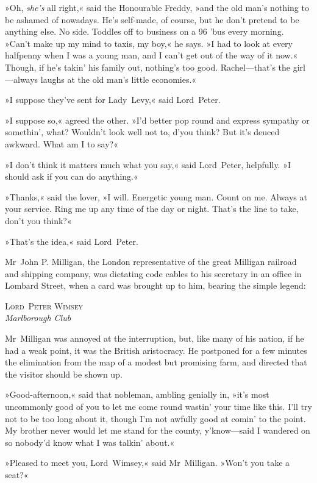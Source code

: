 »Oh, \textit{she's} all right,« said the Honourable Freddy, »and the old man's nothing to be ashamed of nowadays. He's self-made, of course, but he don't pretend to be anything else. No side. Toddles off to business on a 96 'bus every morning. »Can't make up my mind to taxis, my boy,« he says. »I had to look at every halfpenny when I was a young man, and I can't get out of the way of it now.« Though, if he's takin' his family out, nothing's too good. Rachel—that's the girl—always laughs at the old man's little economies.«

»I suppose they've sent for Lady~Levy,« said Lord~Peter.

»I suppose so,« agreed the other. »I'd better pop round and express sympathy or somethin', what? Wouldn't look well not to, d'you think? But it's deuced awkward. What am I to say?«

»I don't think it matters much what you say,« said Lord~Peter, helpfully. »I should ask if you can do anything.«

»Thanks,« said the lover, »I will. Energetic young man. Count on me. Always at your service. Ring me up any time of the day or night. That's the line to take, don't you think?«

»That's the idea,« said Lord~Peter.

Mr~John P\@. Milligan, the London representative of the great Milligan railroad and shipping company, was dictating code cables to his secretary in an office in Lombard Street, when a card was brought up to him, bearing the simple legend:

\begin{center}
\textsc{Lord~Peter Wimsey}\\
\textit{Marlborough Club}
\end{center}

Mr~Milligan was annoyed at the interruption, but, like many of his nation, if he had a weak point, it was the British aristocracy. He postponed for a few minutes the elimination from the map of a modest but promising farm, and directed that the visitor should be shown up.

»Good-afternoon,« said that nobleman, ambling genially in, »it's most uncommonly good of you to let me come round wastin' your time like this. I'll try not to be too long about it, though I'm not awfully good at comin' to the point. My brother never would let me stand for the county, y'know—said I wandered on so nobody'd know what I was talkin' about.«

»Pleased to meet you, Lord~Wimsey,« said Mr~Milligan. »Won't you take a seat?«

